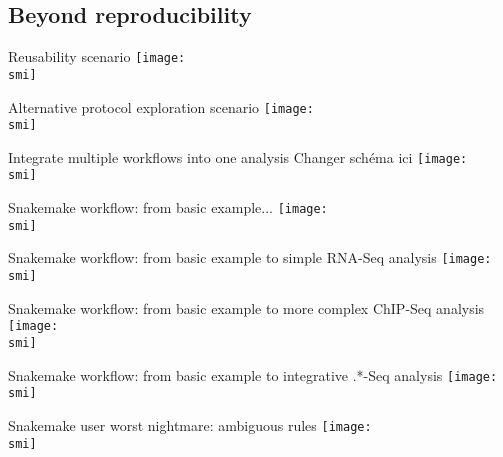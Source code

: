 \documentclass[10pt]{beamer}
\def\smi{out/ln/updir/mw-gcthesis-oral/library.bib}
\begin{document}
\subsection{Beyond reproducibility}
\begin{frame}{Reusability scenario}
  \def\smi{out/ln/updir/mw-gcthesis-oral/ink/reproducibility/arrow_reproducibility_exchange_data.pdf}
  \texttt{[image: \\smi]}
\end{frame}
\begin{frame}{Alternative protocol exploration scenario}
  \def\smi{out/ln/updir/mw-gcthesis-oral/ink/reproducibility/arrow_reproducibility_alternative_protocol.pdf}
  \texttt{[image: \\smi]}
\end{frame}
\begin{frame}{Integrate multiple workflows into one analysis}
  Changer schéma ici
  \def\smi{out/ln/updir/mw-gcthesis-oral/ink/reproducibility/arrow_reproducibility_alternative_protocol.pdf}
  \texttt{[image: \\smi]}
\end{frame}
\begin{frame}{Snakemake workflow: from basic example...}
  \def\smi{out/ln/updir/mw-gcthesis-oral/ink/snakemake/simple_workflow.pdf}
  \texttt{[image: \\smi]}
\end{frame}
\begin{frame}{Snakemake workflow: from basic example to simple RNA-Seq analysis}
  \def\smi{out/ln/updir/mw-gcthesis-oral/ink/snakemake/rna-seq-star-deseq2.png}
  \texttt{[image: \\smi]}
\end{frame}
\begin{frame}{Snakemake workflow: from basic example to more complex ChIP-Seq analysis}
  \def\smi{out/ln/updir/mw-gcthesis-oral/ink/snakemake/snakechunk.png}
  \texttt{[image: \\smi]}
\end{frame}
\begin{frame}{Snakemake workflow: from basic example to integrative .*-Seq analysis}
  \def\smi{out/ln/updir/mw-gcthesis-oral/ink/snakemake/snakechunk.png}
  \texttt{[image: \\smi]}
\end{frame}
\begin{frame}{Snakemake user worst nightmare: ambiguous rules}
  \def\smi{out/ln/updir/mw-gcthesis-oral/ink/snakemake/ambiguous_rules.pdf}
  \texttt{[image: \\smi]}%
\end{frame}
\end{document}
